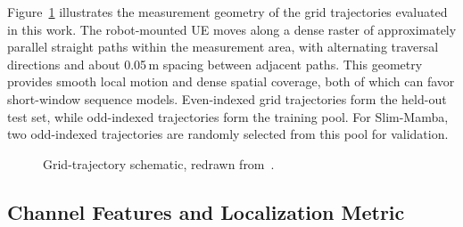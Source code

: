 \documentclass[lettersize,journal]{IEEEtran}
\begin{document}
Figure~\ref{fig:luvira_grid_scenario} illustrates the measurement geometry of the grid trajectories evaluated in this work. The robot-mounted UE moves along a dense raster of approximately parallel straight paths within the measurement area, with alternating traversal directions and about 0.05\,m spacing between adjacent paths. This geometry provides smooth local motion and dense spatial coverage, both of which can favor short-window sequence models.
Even-indexed grid trajectories form the held-out test set, while odd-indexed trajectories form the training pool. For Slim-Mamba, two odd-indexed trajectories are randomly selected from this pool for validation.

\begin{figure}[!t]
  \centering
  
  \caption{Grid-trajectory schematic, redrawn from~\cite{LuViRA2024,Tian2024}.}
  \label{fig:luvira_grid_scenario}
\end{figure}

\subsection{Channel Features and Localization Metric}
\end{document}

